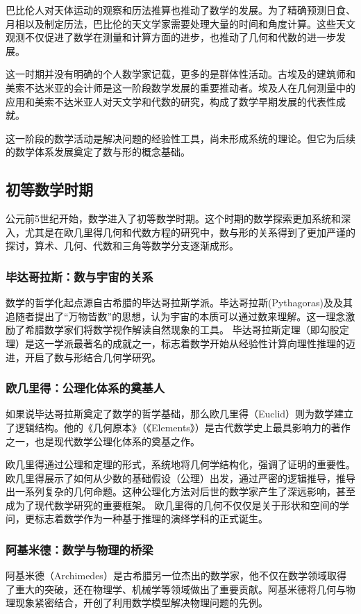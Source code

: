 巴比伦人对天体运动的观察和历法推算也推动了数学的发展。为了精确预测日食、月相以及制定历法，巴比伦的天文学家需要处理大量的时间和角度计算。这些天文观测不仅促进了数学在测量和计算方面的进步，也推动了几何和代数的进一步发展。

这一时期并没有明确的个人数学家记载，更多的是群体性活动。古埃及的建筑师和美索不达米亚的会计师是这一阶段数学发展的重要推动者。埃及人在几何测量中的应用和美索不达米亚人对天文学和代数的研究，构成了数学早期发展的代表性成就。

这一阶段的数学活动是解决问题的经验性工具，尚未形成系统的理论。但它为后续的数学体系发展奠定了数与形的概念基础。

\subsection{初等数学时期}
公元前5世纪开始，数学进入了初等数学时期。这个时期的数学探索更加系统和深入，尤其是在欧几里得几何和代数方程的研究中，数与形的关系得到了更加严谨的探讨，算术、几何、代数和三角等数学分支逐渐成形。

\subsubsection*{毕达哥拉斯：数与宇宙的关系}
数学的哲学化起点源自古希腊的毕达哥拉斯学派。毕达哥拉斯(Pythagoras)及及其追随者提出了“万物皆数”的思想，认为宇宙的本质可以通过数来理解。这一理念激励了希腊数学家们将数学视作解读自然现象的工具。
毕达哥拉斯定理（即勾股定理）是这一学派最著名的成就之一，标志着数学开始从经验性计算向理性推理的迈进，开启了数与形结合几何学研究。

\subsubsection*{欧几里得：公理化体系的奠基人}
如果说毕达哥拉斯奠定了数学的哲学基础，那么欧几里得（Euclid）则为数学建立了逻辑结构。他的《几何原本》（《Elements》）是古代数学史上最具影响力的著作之一，也是现代数学公理化体系的奠基之作。

欧几里得通过公理和定理的形式，系统地将几何学结构化，强调了证明的重要性。欧几里得展示了如何从少数的基础假设（公理）出发，通过严密的逻辑推导，推导出一系列复杂的几何命题。这种公理化方法对后世的数学家产生了深远影响，甚至成为了现代数学研究的重要框架。
欧几里得的几何不仅仅是关于形状和空间的学问，更标志着数学作为一种基于推理的演绎学科的正式诞生。

\subsubsection*{阿基米德：数学与物理的桥梁}
阿基米德（Archimedes）是古希腊另一位杰出的数学家，他不仅在数学领域取得了重大的突破，还在物理学、机械学等领域做出了重要贡献。阿基米德将几何与物理现象紧密结合，开创了利用数学模型解决物理问题的先例。

